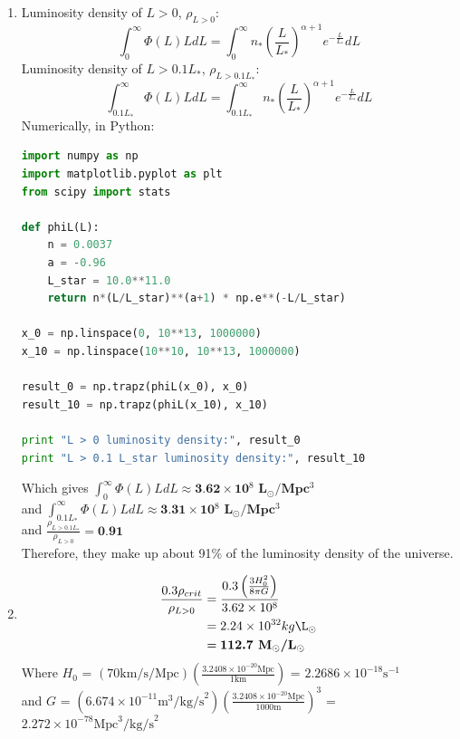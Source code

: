 \documentclass[10pt,letterpaper]{article}
\begin{document}
\begin{enumerate}
\begin{enumerate}
\item Luminosity density of $L > 0$, $\rho_{L>0}$:
\begin{equation}\nonumber
\int_{0}^{\infty} \Phi (L) L dL = \int_{0}^{\infty} n_* \left(\frac{L}{L_*}\right)^{\alpha+1} e^{-\frac{L}{L_*}} dL
\end{equation}
Luminosity density of $L > 0.1 L_*$, $\rho_{L>0.1L_*}$:
\begin{equation}\nonumber
\int_{0.1L_*}^{\infty} \Phi (L) L dL = \int_{0.1L_*}^{\infty} n_* \left(\frac{L}{L_*}\right)^{\alpha+1} e^{-\frac{L}{L_*}} dL
\end{equation}
Numerically, in Python:
\begin{lstlisting}[language=Python]
import numpy as np
import matplotlib.pyplot as plt
from scipy import stats

def phiL(L):
    n = 0.0037
    a = -0.96
    L_star = 10.0**11.0
    return n*(L/L_star)**(a+1) * np.e**(-L/L_star)

x_0 = np.linspace(0, 10**13, 1000000)
x_10 = np.linspace(10**10, 10**13, 1000000)

result_0 = np.trapz(phiL(x_0), x_0)
result_10 = np.trapz(phiL(x_10), x_10)
    
print "L > 0 luminosity density:", result_0
print "L > 0.1 L_star luminosity density:", result_10
\end{lstlisting}
Which gives $\int_{0}^{\infty} \Phi (L) L dL \approx \textbf{3.62$\times$10$^{8}$ L$_\odot$/Mpc$^3$}$\\

and $\int_{0.1 L_*}^{\infty} \Phi (L) L dL \approx \textbf{3.31$\times$10$^{8}$ L$_\odot$/Mpc$^3$}$\\

and $\frac{\rho_{L>0.1L_*}}{\rho_{L>0}} = \textbf{0.91}$\\

Therefore, they make up about 91\% of the luminosity density of the universe.

\item \begin{equation}\nonumber
\begin{split}
\frac{0.3 \rho_{crit}}{\rho_{L>0}} & = \frac{0.3\left(\frac{3H_0^2}{8 \pi G}\right)}{3.62\times10^{8}}\\
 & = 2.24 \times 10^{32} kg\L_\odot\\
 & = \textbf{112.7 M$_\odot$/L$_\odot$}
\end{split}
\end{equation}
Where $H_0$ = $(70\text{km/s/Mpc})(\frac{3.2408\times10^{-20}\text{Mpc}}{1\text{km}})$ = $2.2686\times10^{-18}\text{s}^{-1}$ \\
and $G$ = $(6.674\times10^{-11}\text{m}^3\text{/kg/s}^2)(\frac{3.2408\times10^{-20}\text{Mpc}}{1000\text{m}})^3$ = $2.272\times10^{-78}\text{Mpc}^3\text{/kg/s}^2$\\


\end{enumerate}
\end{enumerate}
\end{document}
